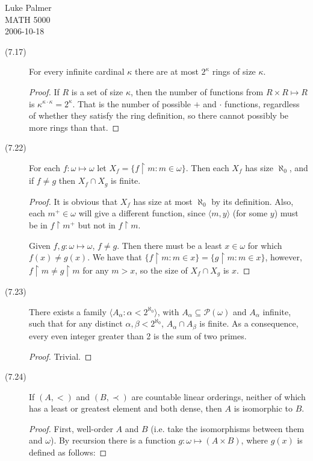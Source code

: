 \documentclass[12pt]{article}
\newcommand{\power}[1]{\mathscr{P}(#1)}
\begin{document}
\noindent Luke Palmer \\
MATH 5000 \\
2006-10-18

\begin{description}
\item[(7.17)] For every infinite cardinal $\kappa$ there are at most
$2^\kappa$ rings of size $\kappa$.
  \begin{proof}
  If $R$ is a set of size $\kappa$, then the number of functions from $R
  \times R \mapsto R$ is $\kappa^{\kappa \cdot \kappa} = 2^\kappa$.
  That is the number of possible $+$ and $\cdot$ functions, regardless
  of whether they satisfy the ring definition, so there cannot possibly
  be more rings than that.
  \end{proof}

\item[(7.22)] For each $f: \omega \mapsto \omega$ let $X_f = \{f
\upharpoonright m : m \in \omega\}$. Then each $X_f$ has size
$\aleph_0$, and if $f \ne g$ then $X_f \cap X_g$ is finite.
  \begin{proof}
  It is obvious that $X_f$ has size at most $\aleph_0$ by its
  definition.  Also, each $m^+ \in \omega$ will give a different
  function, since $\langle m,y \rangle$ (for some $y$) must be in $f
  \upharpoonright m^+$ but not in $f \upharpoonright m$.

  Given $f,g: \omega \mapsto \omega$, $f \ne g$.  Then there must be
  a least $x \in \omega$ for which $f(x) \ne g(x)$.  We have that $\{f
  \upharpoonright m : m \in x\} = \{g \upharpoonright m : m \in x\}$,
  however, $f \upharpoonright m \ne g \upharpoonright m$ for any $m >
  x$, so the size of $X_f \cap X_g$ is $x$.
  \end{proof}

\item[(7.23)] There exists a family $\langle A_\alpha : \alpha <
2^{\aleph_0} \rangle$, with $A_\alpha \subseteq \power{\omega}$ and
$A_\alpha$ infinite,  such that for any distinct $\alpha,\beta <
2^{\aleph_0}$, $A_\alpha \cap A_\beta$ is finite.  As a consequence,
every even integer greater than 2 is the sum of two primes.
  \begin{proof}
  Trivial.
  \end{proof}

\item[(7.24)] If $(A,<)$ and $(B,\prec)$ are countable linear orderings,
neither of which has a least or greatest element and both dense, then
$A$ is isomorphic to $B$.
  \begin{proof}
  First, well-order $A$ and $B$  (i.e. take the isomorphisms between
  them and $\omega$).  By recursion there is a function $g : \omega
  \mapsto (A \times B)$, where $g(x)$ is defined as follows:


\end{proof}
\end{description}
\end{document}
